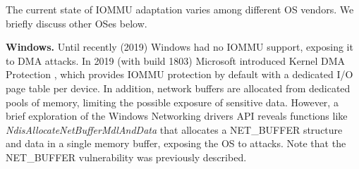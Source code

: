 
The current state of IOMMU adaptation varies among different OS vendors. We briefly discuss other OSes below.

\smallskip
\noindent\textbf{Windows.} Until recently (2019) Windows had no IOMMU support, exposing it to \simple DMA attacks.
In 2019 (with build 1803) Microsoft introduced Kernel DMA Protection \cite{ms_iommu}, which provides IOMMU protection by default with a dedicated I/O page table per device. 
In addition, network buffers are allocated from dedicated pools of memory, limiting the possible exposure of sensitive data. However, a brief exploration of the Windows Networking drivers API reveals functions like \emph{NdisAllocateNetBufferMdlAndData} \cite{ms_single} that allocates a NET\_BUFFER structure and data in a single memory buffer, exposing the OS to \simple attacks. 
Note that the NET\_BUFFER vulnerability was previously described\cite{thunder}. 

